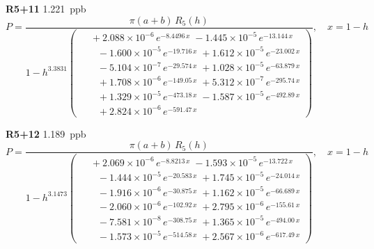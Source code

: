 \documentclass[12pt]{article}
\begin{document}
\noindent\textbf{R5+11} 1.221~ppb\nopagebreak
\begin{equation*}
P = \frac{\pi(a{+}b)\,R_5(h)}{1 - h^{3.3831}\!\left(\!\begin{aligned}
  &\; +2.088{\times}10^{-6}\,e^{-8.4496\,x} \; -1.445{\times}10^{-5}\,e^{-13.144\,x} \\[-3pt]
  &\quad -1.600{\times}10^{-5}\,e^{-19.716\,x} \; +1.612{\times}10^{-5}\,e^{-23.002\,x} \\[-3pt]
  &\quad -5.104{\times}10^{-7}\,e^{-29.574\,x} \; +1.028{\times}10^{-5}\,e^{-63.879\,x} \\[-3pt]
  &\quad +1.708{\times}10^{-6}\,e^{-149.05\,x} \; +5.312{\times}10^{-7}\,e^{-295.74\,x} \\[-3pt]
  &\quad +1.329{\times}10^{-5}\,e^{-473.18\,x} \; -1.587{\times}10^{-5}\,e^{-492.89\,x} \\[-3pt]
  &\quad +2.824{\times}10^{-6}\,e^{-591.47\,x}
\end{aligned}\!\right)}, \quad x = 1{-}h
\end{equation*}

\noindent\textbf{R5+12} 1.189~ppb\nopagebreak
\begin{equation*}
P = \frac{\pi(a{+}b)\,R_5(h)}{1 - h^{3.1473}\!\left(\!\begin{aligned}
  &\; +2.069{\times}10^{-6}\,e^{-8.8213\,x} \; -1.593{\times}10^{-5}\,e^{-13.722\,x} \\[-3pt]
  &\quad -1.444{\times}10^{-5}\,e^{-20.583\,x} \; +1.745{\times}10^{-5}\,e^{-24.014\,x} \\[-3pt]
  &\quad -1.916{\times}10^{-6}\,e^{-30.875\,x} \; +1.162{\times}10^{-5}\,e^{-66.689\,x} \\[-3pt]
  &\quad -2.060{\times}10^{-6}\,e^{-102.92\,x} \; +2.795{\times}10^{-6}\,e^{-155.61\,x} \\[-3pt]
  &\quad -7.581{\times}10^{-8}\,e^{-308.75\,x} \; +1.365{\times}10^{-5}\,e^{-494.00\,x} \\[-3pt]
  &\quad -1.573{\times}10^{-5}\,e^{-514.58\,x} \; +2.567{\times}10^{-6}\,e^{-617.49\,x}
\end{aligned}\!\right)}, \quad x = 1{-}h
\end{equation*}
\end{document}
